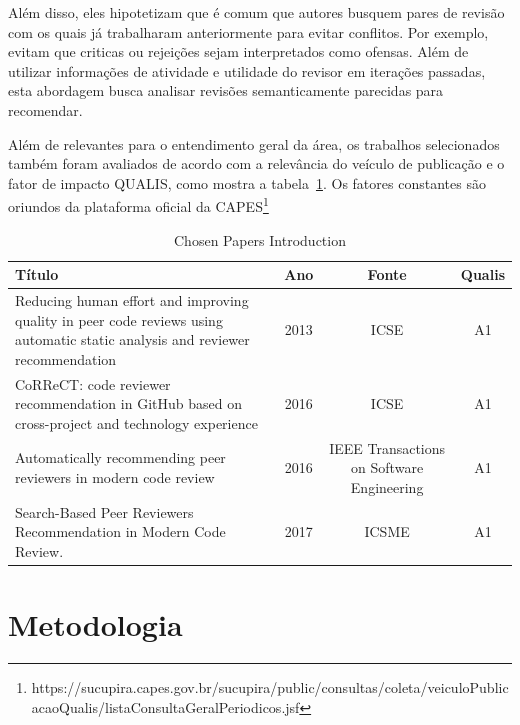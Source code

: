 \documentclass[a4paper,12pt]{monografia}
\theoremstyle{plain}
\theoremstyle{definition}
\theoremstyle{remark}
\begin{document}
Além disso, eles hipotetizam que é comum que autores busquem pares de revisão com os quais já trabalharam anteriormente para evitar conflitos. Por exemplo, evitam que criticas ou rejeições sejam interpretados como ofensas. Além de utilizar informações de atividade e utilidade do revisor em iterações passadas, esta abordagem busca analisar revisões semanticamente parecidas para recomendar.


Além de relevantes para o entendimento geral da área, os trabalhos selecionados também foram avaliados de acordo com a relevância do veículo de publicação e o fator de impacto QUALIS, como mostra a tabela~\ref{tab:presentation}. Os fatores constantes são oriundos da plataforma oficial da CAPES\footnote{https://sucupira.capes.gov.br/sucupira/public/consultas/coleta/veiculoPublicacaoQualis/listaConsultaGeralPeriodicos.jsf}


\begin{table}[!h]
\centering
\begin{tabularx}{\columnwidth}{|X|c|c|c|}
\toprule
\hline
Título                                                                                                                        & Ano & Fonte                               & Qualis &  \\
\hline
Reducing human effort and improving quality in peer code reviews using automatic static analysis and reviewer recommendation & 2013 & ICSE                                      & A1            &  \\
CoRReCT: code reviewer recommendation in GitHub based on cross-project and technology experience                             & 2016 & ICSE                                      & A1            &  \\
Automatically recommending peer reviewers in modern code review                                                              & 2016 & IEEE Transactions on Software Engineering & A1            &  \\
Search-Based Peer Reviewers Recommendation in Modern Code Review.                                                            & 2017 & ICSME                                  & A1            &  \\ \bottomrule
\hline

\end{tabularx}%
\caption{Chosen Papers Introduction}
\label{tab:presentation}
\end{table}


\chapter{Metodologia}
\end{document}
